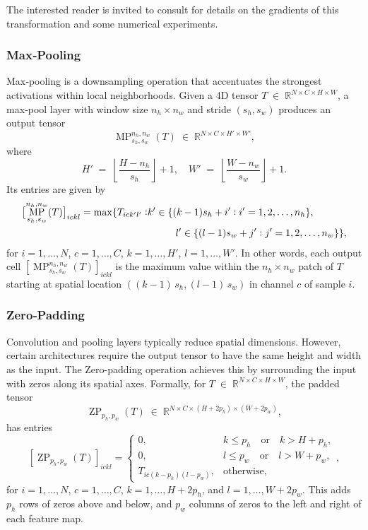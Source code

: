 \documentclass[10pt,a4paper,oneside]{article}
\DeclareMathOperator{\maxpool}{MP}
\DeclareMathOperator{\zeropad}{ZP}
\begin{document}
The interested reader is invited to consult \cite{ioffe2015} for details on the gradients of this transformation and some numerical experiments. 

\subsubsection{Max‐Pooling}

Max‐pooling is a downsampling operation that accentuates the strongest activations within local neighborhoods.  Given a 4D tensor $T \;\in\; \mathbb{R}^{N \times C \times H \times W}$, a max‐pool layer with window size \(n_h \times n_w\) and stride \((s_h,s_w)\) produces an output tensor 
\[
\maxpool^{n_h,n_w}_{s_h,s_w}(T)
\;\in\;
\mathbb{R}^{N \times C \times H' \times W'},
\]
where
\[
H' \;=\;\left\lfloor\frac{H - n_h}{s_h}\right\rfloor + 1,
\quad
W' \;=\;\left\lfloor\frac{W - n_w}{s_w}\right\rfloor + 1.
\]
Its entries are given by
\begin{align*}
    \bigl[\maxpool^{n_h, n_w}_{s_h, s_w}(T)\bigr]_{ickl} = \max \{ T_{ick'l'} :  &k' \in \{ (k - 1) s_h + i' : i' = 1, 2, \dots, n_h \},\\
    &\hspace{10mm} l' \in \{ (l - 1) s_w + j' : j' = 1, 2, \dots, n_w \}\},
\end{align*}
for $i=1,\dots,N$,\; $c=1,\dots,C$,\; $k=1,\dots,H'$,\;
$l=1,\dots,W'$. In other words, each output cell $\left[\maxpool^{n_h, n_w}_{s_h, s_w}(T)\right]_{ickl}$ is the maximum value within the \(n_h\times n_w\) patch of \(T\) starting at spatial location \(((k - 1)\,s_h, (l - 1) \,s_w)\) in channel \(c\) of sample \(i\).


\subsubsection{Zero‐Padding}

Convolution and pooling layers typically reduce spatial dimensions.  However, certain architectures require the output tensor to have the same height and width as the input.  The Zero-padding operation achieves this by surrounding the input with zeros along its spatial axes.  Formally, for $T \;\in\; \mathbb{R}^{N \times C \times H \times W}$, the padded tensor
\[
\zeropad_{p_h,p_w}(T)
\;\in\;
\mathbb{R}^{N \times C \times (H + 2p_h) \times (W + 2p_w)},
\]
has entries
\[
\left[\zeropad_{p_h,p_w}(T)\right]_{ickl}
=
\begin{cases}
0, & k \le p_h \quad\text{or}\quad k > H + p_h,\\[4pt]
0, & l \le p_w \quad\text{or}\quad l > W + p_w,\\[4pt]
T_{ic(k - p_h)(l - p_w)}, & \text{otherwise},
\end{cases},
\]
for \(i=1,\dots,N\), \(c=1,\dots,C\), \(k=1,\dots,H+2p_h\), and \(l=1,\dots,W+2p_w\).  This adds \(p_h\) rows of zeros above and below, and \(p_w\) columns of zeros to the left and right of each feature map.
\end{document}
